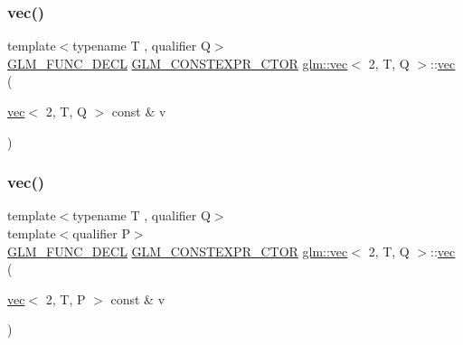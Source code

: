 \subsubsection{\texorpdfstring{vec()}{vec()}\hspace{0.1cm}{\footnotesize\ttfamily [2/17]}}
{\footnotesize\ttfamily template$<$typename T , qualifier Q$>$ \\
\hyperlink{setup_8hpp_ab2d052de21a70539923e9bcbf6e83a51}{G\+L\+M\+\_\+\+F\+U\+N\+C\+\_\+\+D\+E\+CL} \hyperlink{setup_8hpp_ad34178a09666081abdb573c14d1f4a5a}{G\+L\+M\+\_\+\+C\+O\+N\+S\+T\+E\+X\+P\+R\+\_\+\+C\+T\+OR} \hyperlink{structglm_1_1vec}{glm\+::vec}$<$ 2, T, Q $>$\+::\hyperlink{structglm_1_1vec}{vec} (\begin{DoxyParamCaption}\item[{\hyperlink{structglm_1_1vec}{vec}$<$ 2, T, Q $>$ const \&}]{v }\end{DoxyParamCaption})}

\mbox{\label{structglm_1_1vec_3_012_00_01_t_00_01_q_01_4_a7eb23dcef5e913dc1e07d004db53d201}} 
\subsubsection{\texorpdfstring{vec()}{vec()}\hspace{0.1cm}{\footnotesize\ttfamily [3/17]}}
{\footnotesize\ttfamily template$<$typename T , qualifier Q$>$ \\
template$<$qualifier P$>$ \\
\hyperlink{setup_8hpp_ab2d052de21a70539923e9bcbf6e83a51}{G\+L\+M\+\_\+\+F\+U\+N\+C\+\_\+\+D\+E\+CL} \hyperlink{setup_8hpp_ad34178a09666081abdb573c14d1f4a5a}{G\+L\+M\+\_\+\+C\+O\+N\+S\+T\+E\+X\+P\+R\+\_\+\+C\+T\+OR} \hyperlink{structglm_1_1vec}{glm\+::vec}$<$ 2, T, Q $>$\+::\hyperlink{structglm_1_1vec}{vec} (\begin{DoxyParamCaption}\item[{\hyperlink{structglm_1_1vec}{vec}$<$ 2, T, P $>$ const \&}]{v }\end{DoxyParamCaption})}

\mbox{\label{structglm_1_1vec_3_012_00_01_t_00_01_q_01_4_a638fde20902e4e7546f71dfad919a17f}} 
